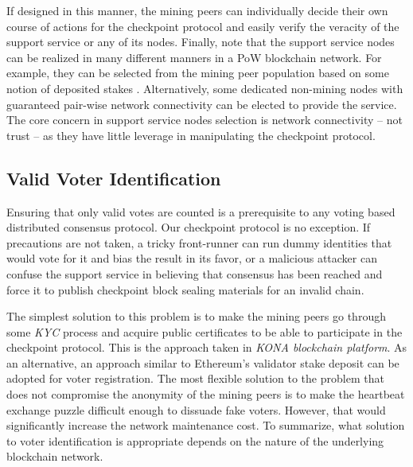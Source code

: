 If designed in this manner, the mining peers can individually decide their own course of actions for the checkpoint protocol and easily verify the veracity of the support service or any of its nodes. Finally, note that the support service nodes can be realized in many different manners in a PoW blockchain network. For example, they can be selected from the mining peer population based on some notion of deposited stakes \cite{casper}. Alternatively, some dedicated non-mining nodes with guaranteed pair-wise network connectivity can be elected to provide the service. The core concern in support service nodes selection is network connectivity -- not trust -- as they have little leverage in manipulating the checkpoint protocol.
   
\subsection{Valid Voter Identification}
Ensuring that only valid votes are counted is a prerequisite to any voting based distributed consensus protocol. Our checkpoint protocol is no exception. If precautions are not taken, a tricky front-runner can run dummy identities that would vote for it and bias the result in its favor, or a malicious attacker can confuse the support service in believing that consensus has been reached and force it to publish checkpoint block sealing materials for an invalid chain.

The simplest solution to this problem is to make the mining peers go through some \textit{KYC} process and acquire public certificates to be able to participate in the checkpoint protocol. This is the approach taken in \textit{KONA blockchain platform}. As an alternative, an approach similar to Ethereum's validator stake deposit \cite{casper} can be adopted for voter registration. The most flexible solution to the problem that does not compromise the anonymity of the mining peers is to make the heartbeat exchange puzzle difficult enough to dissuade fake voters. However, that would significantly increase the network maintenance cost. To summarize, what solution to voter identification is appropriate depends on the nature of the underlying blockchain network.       

